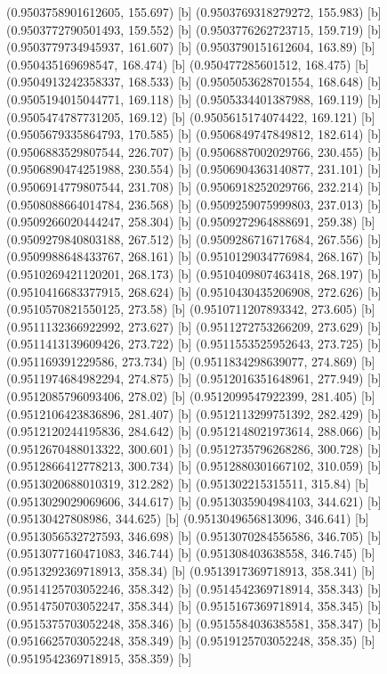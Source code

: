 {{{(0.9503758901612605, 155.697) [b] 
(0.9503769318279272, 155.983) [b] 
(0.9503772790501493, 159.552) [b] 
(0.9503776262723715, 159.719) [b] 
(0.9503779734945937, 161.607) [b] 
(0.9503790151612604, 163.89) [b] 
(0.950435169698547, 168.474) [b] 
(0.950477285601512, 168.475) [b] 
(0.9504913242358337, 168.533) [b] 
(0.9505053628701554, 168.648) [b] 
(0.9505194015044771, 169.118) [b] 
(0.9505334401387988, 169.119) [b] 
(0.9505474787731205, 169.12) [b] 
(0.9505615174074422, 169.121) [b] 
(0.9505679335864793, 170.585) [b] 
(0.9506849747849812, 182.614) [b] 
(0.9506883529807544, 226.707) [b] 
(0.9506887002029766, 230.455) [b] 
(0.9506890474251988, 230.554) [b] 
(0.9506904363140877, 231.101) [b] 
(0.9506914779807544, 231.708) [b] 
(0.9506918252029766, 232.214) [b] 
(0.9508088664014784, 236.568) [b] 
(0.9509259075999803, 237.013) [b] 
(0.9509266020444247, 258.304) [b] 
(0.9509272964888691, 259.38) [b] 
(0.9509279840803188, 267.512) [b] 
(0.9509286716717684, 267.556) [b] 
(0.9509988648433767, 268.161) [b] 
(0.9510129034776984, 268.167) [b] 
(0.9510269421120201, 268.173) [b] 
(0.9510409807463418, 268.197) [b] 
(0.9510416683377915, 268.624) [b] 
(0.9510430435206908, 272.626) [b] 
(0.9510570821550125, 273.58) [b] 
(0.9510711207893342, 273.605) [b] 
(0.9511132366922992, 273.627) [b] 
(0.9511272753266209, 273.629) [b] 
(0.9511413139609426, 273.722) [b] 
(0.9511553525952643, 273.725) [b] 
(0.951169391229586, 273.734) [b] 
(0.9511834298639077, 274.869) [b] 
(0.9511974684982294, 274.875) [b] 
(0.9512016351648961, 277.949) [b] 
(0.9512085796093406, 278.02) [b] 
(0.9512099547922399, 281.405) [b] 
(0.9512106423836896, 281.407) [b] 
(0.9512113299751392, 282.429) [b] 
(0.9512120244195836, 284.642) [b] 
(0.9512148021973614, 288.066) [b] 
(0.9512670488013322, 300.601) [b] 
(0.9512735796268286, 300.728) [b] 
(0.9512866412778213, 300.734) [b] 
(0.9512880301667102, 310.059) [b] 
(0.9513020688010319, 312.282) [b] 
(0.951302215315511, 315.84) [b] 
(0.9513029029069606, 344.617) [b] 
(0.9513035904984103, 344.621) [b] 
(0.95130427808986, 344.625) [b] 
(0.9513049656813096, 346.641) [b] 
(0.9513056532727593, 346.698) [b] 
(0.9513070284556586, 346.705) [b] 
(0.9513077160471083, 346.744) [b] 
(0.951308403638558, 346.745) [b] 
(0.9513292369718913, 358.34) [b] 
(0.9513917369718913, 358.341) [b] 
(0.9514125703052246, 358.342) [b] 
(0.9514542369718914, 358.343) [b] 
(0.9514750703052247, 358.344) [b] 
(0.9515167369718914, 358.345) [b] 
(0.9515375703052248, 358.346) [b] 
(0.9515584036385581, 358.347) [b] 
(0.9516625703052248, 358.349) [b] 
(0.9519125703052248, 358.35) [b] 
(0.9519542369718915, 358.359) [b] 
}}}
